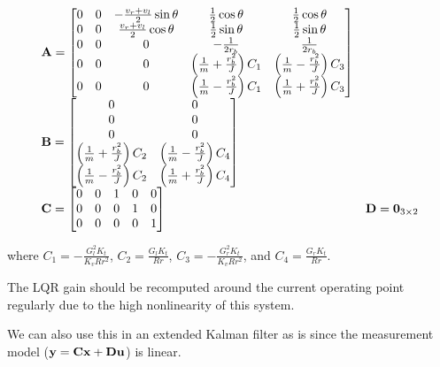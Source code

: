 \begin{theorem}
  \begin{equation}
    \begin{array}{ll}
      \mathbf{A} =
      \begin{bmatrix}
        0 & 0 & -\frac{v_r + v_l}{2}\sin\theta & \frac{1}{2}\cos\theta &
          \frac{1}{2}\cos\theta \\
        0 & 0 & \frac{v_r + v_l}{2}\cos\theta & \frac{1}{2}\sin\theta &
          \frac{1}{2}\sin\theta \\
        0 & 0 & 0 & -\frac{1}{2r_b} & \frac{1}{2r_b} \\
        0 & 0 & 0 & \left(\frac{1}{m} + \frac{r_b^2}{J}\right) C_1 &
          \left(\frac{1}{m} - \frac{r_b^2}{J}\right) C_3 \\
        0 & 0 & 0 & \left(\frac{1}{m} - \frac{r_b^2}{J}\right) C_1 &
          \left(\frac{1}{m} + \frac{r_b^2}{J}\right) C_3
      \end{bmatrix} \\
      \mathbf{B} =
      \begin{bmatrix}
        0 & 0 \\
        0 & 0 \\
        0 & 0 \\
        \left(\frac{1}{m} + \frac{r_b^2}{J}\right) C_2 &
        \left(\frac{1}{m} - \frac{r_b^2}{J}\right) C_4 \\
        \left(\frac{1}{m} - \frac{r_b^2}{J}\right) C_2 &
        \left(\frac{1}{m} + \frac{r_b^2}{J}\right) C_4
      \end{bmatrix} \\
      \mathbf{C} =
      \begin{bmatrix}
        0 & 0 & 1 & 0 & 0 \\
        0 & 0 & 0 & 1 & 0 \\
        0 & 0 & 0 & 0 & 1
      \end{bmatrix} &
      \mathbf{D} = \mathbf{0}_{3 \times 2}
    \end{array}
  \end{equation}

  where $C_1 = -\frac{G_l^2 K_t}{K_v R r^2}$, $C_2 = \frac{G_l K_t}{Rr}$,
  $C_3 = -\frac{G_r^2 K_t}{K_v R r^2}$, and $C_4 = \frac{G_r K_t}{Rr}$.

  The LQR gain should be recomputed around the current operating point regularly
  due to the high nonlinearity of this system.
\end{theorem}

We can also use this in an extended Kalman filter as is since the measurement
model ($\mathbf{y} = \mathbf{C}\mathbf{x} + \mathbf{D}\mathbf{u}$) is linear.


